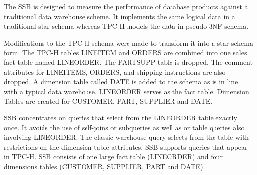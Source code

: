 The  SSB  is  designed  to  measure the performance  of  database products  against  a  traditional  data  warehouse  scheme.  It  implements  the  same  logical  data  in  a  traditional  star  schema whereas TPC-H models the data in pseudo 3NF schema.

Modifications to  the  TPC-H  schema were made to transform  it  into  a star  schema  form.  The TPC-H tables LINEITEM and ORDERS are combined into one sales fact table named LINEORDER. The PARTSUPP table  is  dropped.  The comment  attributes  for LINEITEMS, ORDERS,  and  shipping instructions  are  also  dropped. A  dimension  table  called DATE is  added  to  the  schema as  is  in  line  with  a  typical  data  warehouse. LINEORDER serves  as the fact  table.  Dimension Tables  are  created  for CUSTOMER, PART, SUPPLIER and DATE.

SSB concentrates on queries that select from the LINEORDER table  exactly  once.  It  avoids   the use  of  self-joins  or  subqueries  as  well  as  or  table  queries also  involving LINEORDER.  The  classic  warehouse  query selects  from  the  table  with  restrictions  on  the  dimension table attributes. SSB supports queries that appear in TPC-H. SSB consists of one large fact table (LINEORDER) and four dimensions tables (CUSTOMER, SUPPLIER, PART and DATE).
